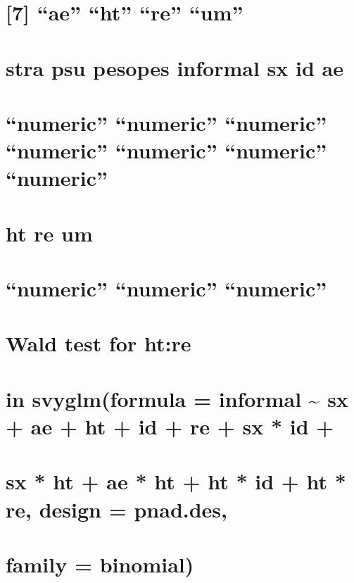 \documentclass[]{book}
\theoremstyle{definition}
\theoremstyle{definition}
\theoremstyle{definition}
\theoremstyle{remark}
\begin{document}
\section{\texorpdfstring{{[}7{]} ``ae'' ``ht'' ``re''
``um''}{{[}7{]} ae ht re um}}\label{ae-ht-re-um}

\section{stra psu pesopes informal sx id
ae}\label{stra-psu-pesopes-informal-sx-id-ae}

\section{\texorpdfstring{``numeric'' ``numeric'' ``numeric'' ``numeric''
``numeric'' ``numeric''
``numeric''}{numeric numeric numeric numeric numeric numeric numeric}}\label{numeric-numeric-numeric-numeric-numeric-numeric-numeric}

\section{ht re um}\label{ht-re-um}

\section{\texorpdfstring{``numeric'' ``numeric''
``numeric''}{numeric numeric numeric}}\label{numeric-numeric-numeric}

\section{Wald test for ht:re}\label{wald-test-for-htre}

\section{in svyglm(formula = informal \textasciitilde{} sx + ae + ht +
id + re + sx * id
+}\label{in-svyglmformula-informal-sx-ae-ht-id-re-sx-id}

\section{sx * ht + ae * ht + ht * id + ht * re, design =
pnad.des,}\label{sx-ht-ae-ht-ht-id-ht-re-design-pnad.des}

\section{family = binomial)}\label{family-binomial}
\end{document}

